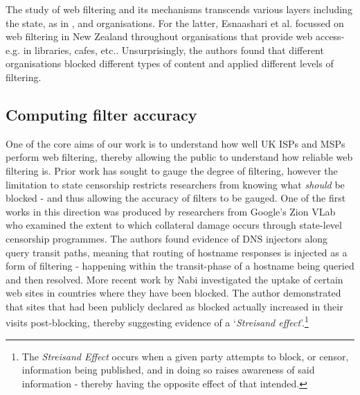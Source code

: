 \documentclass{bmcart}
\begin{document}
The study of web filtering and its mechanisms transcends various layers including the state, as in \cite{verkamp2012inferring, dalek2013method, crete2013not, aceto2015monitoring}, and organisations.
For the latter, Esnaashari et al. \cite{esnaashari2014restrictions} focussed on web filtering in New Zealand throughout organisations that provide web access- e.g. in libraries, cafes, etc..
Unsurprisingly, the authors found that different organisations blocked different types of content and applied different levels of filtering.

\subsection*{Computing filter accuracy}
One of the core aims of our work is to understand how well UK ISPs and MSPs perform web filtering, thereby allowing the public to understand how reliable web filtering is.
Prior work has sought to gauge the degree of filtering, however the limitation to state censorship restricts researchers from knowing what \textit{should} be blocked - and thus allowing the accuracy of filters to be gauged.
One of the first works in this direction was produced by researchers from Google's Zion VLab \cite{Anonymous:2012:CDI:2317307.2317311} who examined the extent to which collateral damage occurs through state-level censorship programmes.
The authors found evidence of DNS injectors along query transit paths, meaning that routing of hostname responses is injected as a form of filtering - happening within the transit-phase of a hostname being queried and then resolved.
More recent work by Nabi \cite{nabi2014censorship} investigated the uptake of certain web sites in countries where they have been blocked.
The author demonstrated that sites that had been publicly declared as blocked actually increased in their visits post-blocking, thereby suggesting evidence of a `\textit{Streisand effect}'.\footnote{The \textit{Streisand Effect} occurs when a given party attempts to block, or censor, information being published, and in doing so raises awareness of said information - thereby having the opposite effect of that intended.}
\end{document}
